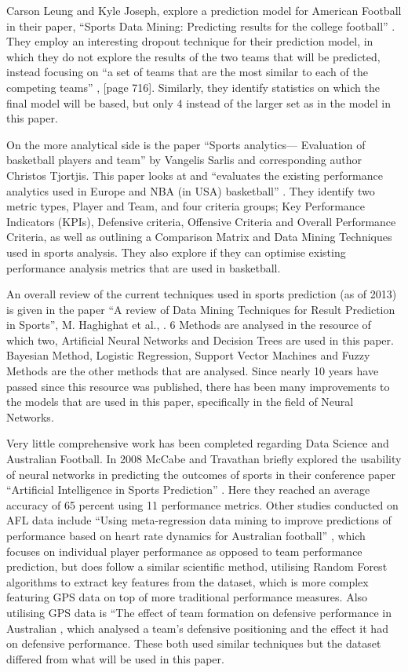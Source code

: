 \documentclass{imc-inf}
\begin{document}
	Carson Leung and Kyle Joseph, explore a prediction model for American Football in their paper, “Sports Data Mining: Predicting results for the college football” \cite{CollegeFootball}. They employ an interesting dropout technique for their prediction model, in which they do not explore the results of the two teams that will be predicted, instead focusing on “a set of teams that are the most similar to each of the competing teams” \cite{CollegeFootball}, [page 716]. Similarly, they identify statistics on which the final model will be based, but only 4 instead of the larger set as in the model in this paper.
	
	On the more analytical side is the paper “Sports analytics— Evaluation of basketball players and team” by Vangelis Sarlis and corresponding author Christos Tjortjis. This paper looks at and “evaluates the existing performance analytics used in Europe and NBA (in USA) basketball” \cite{Basketball}. They identify two metric types, Player and Team, and four criteria groups; Key Performance Indicators (KPIs), Defensive criteria, Offensive Criteria and Overall Performance Criteria, as well as outlining a Comparison Matrix and Data Mining Techniques used in sports analysis. They also explore if they can optimise existing performance analysis metrics that are used in basketball. 
	
	An overall review of the current techniques used in sports prediction (as of 2013) is given in the paper “A review of Data Mining Techniques for Result Prediction in Sports”, M. Haghighat et al., \cite{ResearchGate}. 6 Methods are analysed in the resource of which two, Artificial Neural Networks and Decision Trees are used in this paper. Bayesian Method, Logistic Regression, Support Vector Machines and Fuzzy Methods are the other methods that are analysed. Since nearly 10 years have passed since this resource was published, there has been many improvements to the models that are used in this paper, specifically in the field of Neural Networks. 
	
	Very little comprehensive work has been completed regarding Data Science and Australian Football. In 2008 McCabe and Travathan briefly explored the usability of neural networks in predicting the outcomes of sports in their conference paper “Artificial Intelligence in Sports Prediction” \cite{AFL_1}. Here they reached an average accuracy of 65 percent using 11 performance metrics. Other studies conducted on AFL data include “Using meta-regression data mining to improve predictions of performance based on heart rate dynamics for Australian football” \cite{AFL_2}, which focuses on individual player performance as opposed to team performance prediction, but does follow a similar scientific method, utilising Random Forest algorithms to extract key features from the dataset, which is more complex featuring GPS data on top of more traditional performance measures. Also utilising GPS data is “The effect of team formation on defensive performance in Australian \cite{AFL_3}, which analysed a team’s defensive positioning and the effect it had on defensive performance. These both used similar techniques but the dataset differed from what will be used in this paper.
	
\end{document}
